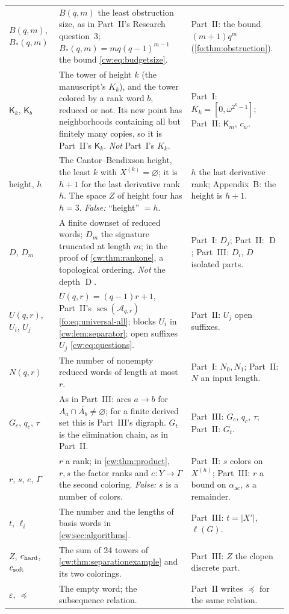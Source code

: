 \documentclass[11pt,letterpaper]{article}
\numberwithin{equation}{section}
\theoremstyle{definition}
\theoremstyle{remark}
\theoremstyle{definition}
\newcommand{\eps}{\varepsilon}
\newcommand{\A}{\mathcal A}
\newcommand{\scs}{\operatorname{scs}}
\newcommand{\depth}{\operatorname{D}}
\newcommand{\subseq}{\preccurlyeq}
\newcommand{\Tw}{\mathsf K}
\newcommand{\ac}{\alpha_{\mathrm{ac}}}
\newcommand{\cwcl}[1]{\overline{#1}}
\begin{document}
\begin{center}
\begin{longtable}{@{}>{\raggedright\arraybackslash}p{0.14\linewidth}>{\raggedright\arraybackslash}p{0.45\linewidth}>{\raggedright\arraybackslash}p{0.33\linewidth}@{}}
$B(q,m)$, $B_*(q,m)$ & $B(q,m)$ the least obstruction size, as in Part~II's
Research question~3; $B_*(q,m)=mq(q-1)^{m-1}$ the bound
\eqref{cw:eq:budgetsize}. & Part~II: the bound $(m+1)q^m$
(\cref{fo:thm:obstruction}).\\
$\Tw_k$, $\Tw_b$ & The tower of height $k$ (the manuscript's $K_k$), and the
tower colored by a rank word $b$, reduced or not. Its new point has
neighborhoods containing all but finitely many copies, so it is Part~II's
$\Tw_k$. \emph{Not} Part~I's $K_k$. & Part~I: $K_k=[0,\omega^{2^k-1}]$;
Part~II: $\Tw_m$, $c_w$.\\
height, $h$ & The Cantor--Bendixson height, the least $k$ with
$X^{(k)}=\varnothing$; it is $h+1$ for the last derivative rank $h$. The
space $Z$ of height four has $h=3$. \emph{False:} ``height'' $=h$. & $h$ the
last derivative rank; Appendix~B: the height is $h+1$.\\
$D$, $D_m$ & A finite downset of reduced words; $D_m$ the signature
truncated at length $m$; in the proof of \cref{cw:thm:rankone}, a topological
ordering. \emph{Not} the depth $\depth$. & Part~I: $D_j$; Part~II: $\depth$;
Part~III: $D_i$, $D$ isolated parts.\\
$U(q,r)$, $U_i$, $U_j$ & $U(q,r)=(q-1)r+1$, Part~II's
$\scs(\A_{q,r})$ \eqref{fo:eq:universal-all}; blocks $U_i$ in
\cref{cw:lem:separator}; open suffixes $U_j$ \eqref{cw:eq:questions}. &
Part~II: $U_j$ open suffixes.\\
$N(q,r)$ & The number of nonempty reduced words of length at most $r$. &
Part~I: $N_0,N_1$; Part~II: $N$ an input length.\\
$G_c$, $q_c$, $\tau$ & As in Part~III: arcs $a\to b$ for
$A_a\cap\cwcl{A_b}\ne\varnothing$; for a finite derived set this is
Part~III's digraph. $G_t$ is the elimination chain, as in Part~II. &
Part~III: $G_c$, $q_c$, $\tau$; Part~II: $G_t$.\\
$r$, $s$, $e$, $\Gamma$ & $r$ a rank; in \cref{cw:thm:product}, $r,s$ the
factor ranks and $e:Y\to\Gamma$ the second coloring. \emph{False:} $s$ is a
number of colors. & Part~II: $s$ colors on $X^{(h)}$; Part~III: $r$ a bound
on $\ac$, $s$ a remainder.\\
$t$, $\ell_i$ & The number and the lengths of basis words in
\cref{cw:sec:algorithms}. & Part~III: $t=\lvert X'\rvert$, $\ell(G)$.\\
$Z$, $c_{\rm hard}$, $c_{\rm soft}$ & The sum of 24 towers of
\cref{cw:thm:separationexample} and its two colorings. & Part~III: $Z$ the
clopen discrete part.\\
$\eps$, $\preceq$ & The empty word; the subsequence relation. & Part~II
writes $\subseq$ for the same relation.\\
\bottomrule
\end{longtable}
\end{center}
\end{document}
